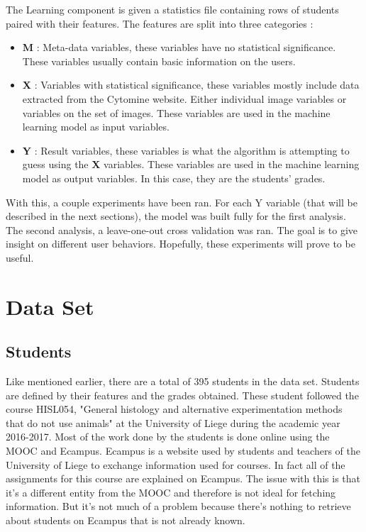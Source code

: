\documentclass[a4paper,11pt]{report}
\numberwithin{figure}{section} %
\begin{document}
    The Learning component is given a statistics file containing rows of students paired with their features.
    The features are split into three categories :
    \begin{itemize}
\item[\textbullet] \textbf{M} : Meta-data variables, these variables have no statistical significance.
These variables usually contain basic information on the users.\\
\item[\textbullet] \textbf{X} : Variables with statistical significance, these variables mostly include data extracted from the Cytomine website.
Either individual image variables or variables on the set of images.
These variables are used in the machine learning model as input variables.\\
\item[\textbullet] \textbf{Y} : Result variables, these variables is what the algorithm is attempting to guess using the  \textbf{X} variables.
These variables are used in the machine learning model as output variables. In this case, they are the students' grades.\\
\end{itemize}

    With this, a couple experiments have been ran.
    For each Y variable (that will be described in the next sections), the model was built fully for the first analysis.
    The second analysis, a leave-one-out cross validation was ran.
    The goal is to give insight on different user behaviors.
    Hopefully, these experiments will prove to be useful.

    \section{Data Set} \label{Data_Set}

    	\subsection{Students}
    Like mentioned earlier, there are a total of 395 students in the data set.
    Students are defined by their features and the grades obtained.
    These student followed the course HISL054, "General histology and alternative experimentation methods that do not use animals" at the University of Liege during the academic year 2016-2017.
    Most of the work done by the students is done online using the MOOC and Ecampus.
    Ecampus is a website used by students and teachers of the University of Liege to exchange information used for courses.
    In fact all of the assignments for this course are explained on Ecampus.
    The issue with this is that it's a different entity from the MOOC and therefore is not ideal for fetching information.
    But it's not much of a problem because there's nothing to retrieve about students on Ecampus that is not already known.\newline
\end{document}
